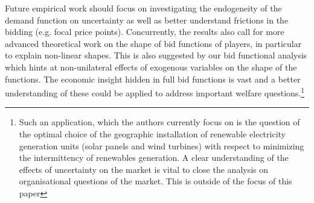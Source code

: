 Future empirical work should focus on investigating the endogeneity of the demand function on uncertainty as well as better understand frictions in the bidding (e.g. focal price points). Concurrently, the results also call for more advanced theoretical work on the shape of bid functions of players, in particular to explain non-linear shapes. This is also suggested by our bid functional analysis which hints at non-unilateral effects of exogenous variables on the shape of the functions. The economic insight hidden in full bid functions is vast and a better understanding of these could be applied to address important welfare questions.\footnote{Such an application, which the authors currently focus on is the question of the optimal choice of the geographic installation of renewable electricity generation units (solar panels and wind turbines) with respect to minimizing the intermittency of renewables generation. A clear understanding of the effects of uncertainty on the market is vital to close the analysis on organisational questions of the market. This is outside of the focus of this paper}\\

